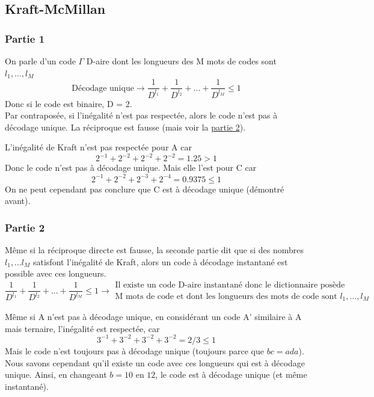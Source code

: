 \documentclass[11pt,a4paper]{article}
\begin{document}
\subsection{Kraft-McMillan}
\subsubsection{Partie 1}
On parle d'un code $\Gamma$ D-aire dont les longueurs des M mots de codes sont $l_1,\ldots,l_M$
\begin{equation}
	\text{Décodage unique} \to \frac{1}{D^{l_1}} + \frac{1}{D^{l_2}} + ... + \frac{1}{D^{l_M}} \leq 1
\end{equation}
Donc si le code est binaire, D = 2. \\
Par contraposée, si l'inégalité n'est pas respectée, alors le code n'est pas à décodage unique. La réciproque est fausse (mais voir la \hyperref[partie 2]{partie 2}).
\begin{exemple}
	L'inégalité de Kraft n'est pas respectée pour A car 
	\begin{equation*}
		2^{-1} + 2^{-2} + 2^{-2} + 2^{-2} = 1.25 > 1
	\end{equation*}
	Donc le code n'est pas à décodage unique. Mais elle l'est pour C car 
	\begin{equation*}
		2^{-1} + 2^{-2} + 2^{-3} + 2^{-4} = 0.9375 \leq 1
	\end{equation*}
	On ne peut cependant pas conclure que C est à décodage unique (démontré avant).
\end{exemple}
\subsubsection{Partie 2}
\label{partie 2}
Même si la réciproque directe est fausse, la seconde partie dit que si des nombres $l_1,...l_M$ satisfont l'inégalité de Kraft, alors un code à décodage instantané est possible avec ces longueurs.
\begin{equation*}
	\frac{1}{D^{l_1}} + \frac{1}{D^{l_2}} + ... + \frac{1}{D^{l_M}} \leq 1 \to \substack{\text{Il existe un code D-aire instantané donc le dictionnaire posède}\\ \text{M mots de code  et dont les longueurs des mots de code sont }l_1,...,l_M}
\end{equation*}
\begin{exemple}
	Même si A n'est pas à décodage unique, en considérant un code A' similaire à A mais ternaire, l'inégalité est respectée, car 
	\begin{equation*}
		3^{-1} + 3^{-2} + 3^{-2} + 3^{-2} = 2/3 \leq 1
	\end{equation*}
	Mais le code n'est toujours pas à décodage unique (toujours parce que $bc = ada$). Nous savons cependant qu'il existe un code avec ces longueurs qui est à décodage unique. Ainsi, en changeant $b = 10$ en $12$, le code est à décodage unique (et même instantané).
\end{exemple}
\end{document}
